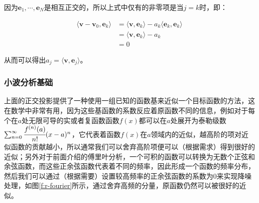 \noindent 因为$\mathbf{e}_1,\cdots,\mathbf{e}_N$是相互正交的，所以上式中仅有的非零项是当$j=k$时，即：

\begin{equation}
\begin{aligned}
	\langle\mathbf{v}-\mathbf{v}_0,\mathbf{e}_k\rangle&=\langle\mathbf{v},\mathbf{e}_k\rangle-a_k\langle\mathbf{e}_k,\mathbf{e}_k\rangle\\
	&=\langle\mathbf{v},\mathbf{e}_k\rangle-a_k\\
	&=0
\end{aligned}
\end{equation}

\noindent 从而可以得出$a_j=\langle\mathbf{v},\mathbf{e}_j\rangle$。




\subsubsection{小波分析基础}\label{sec:r-wavelets}
上面的正交投影提供了一种使用一组已知的函数基来近似一个目标函数的方法，这在数学中非常有用，因为这些基函数的系数反应着原函数不同的信息，例如对于每个在$a$处无限可导的实或者复函数函数$f(x)$都可以在$a$处展开为泰勒级数$\sum^{\infty}_{n=0} \cfrac{f^{(n)}(a)}{n!}(x-a)^{n}$，它代表着函数$f(x)$在$a$领域内的近似，越高阶的项对近似函数的贡献越小，所以通常我们可以舍弃高阶项便可以（根据需求）得到很好的近似；另外对于前面介绍的傅里叶分析，一个可积的函数可以转换为无数个正弦和余弦函数，而这些正余弦函数代表着不同的频率，因此形成一个函数的频率分布，然后我们可以通过（根据需要）设置较高频率的正余弦函数的系数为0来实现降噪处理，如图\ref{f:r-fourier}所示，通过舍弃高频的分量，原函数仍然可以被很好的近似。

